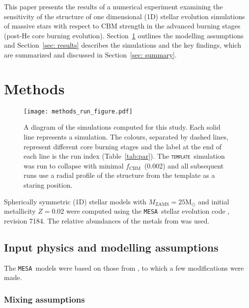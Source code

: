 \documentclass[useAMS,usenatbib]{mn2e}
\newcommand{\Msun}{\ensuremath{\mathrm{M}_\odot}}
\newcommand{\fcbm}{\ensuremath{f_\mathrm{CBM}}}
\newcommand{\mesa}{\texttt{MESA}}
\newcommand{\template}{\textsc{\texttt{template}}}
\begin{document}
This paper presents the results of a numerical experiment examining the sensitivity of the
structure of one dimensional (1D) stellar evolution simulations of massive stars
with respect to CBM strength in the advanced burning stages (post-He core
burning evolution). Section~\ref{sec: methods} outlines the modelling
assumptions and Section~\ref{sec: results} describes the simulations and the key
findings, which are summarized and discussed in Section~\ref{sec: summary}.

\section{Methods} \label{sec: methods}

\begin{figure*}
	\texttt{[image: methods\_run\_figure.pdf]}
	\caption{
		A diagram of the simulations computed for this study. Each solid line
		represents a simulation. The colours, separated by dashed lines, represent
		different core burning stages and the label at the end of each line is the run
		index (Table~\ref{tab:par}). The \template\ simulation was run to collapse
		with minimal \fcbm~(0.002) and all subsequent runs use a radial profile of the
		structure from the template as a staring position.
	}
	\label{fig:2_runs} %
\end{figure*}

Spherically symmetric (1D) stellar models with $M_\mathrm{ZAMS}=25\Msun$ and
initial metallicity $Z=0.02$ were computed using the \mesa~stellar
evolution code \citep{MESA2011,MESA2013,MESA2015}, revision 7184. The relative
abundances of the metals from \citet{Grevesse1993} was used.

\subsection{Input physics and modelling assumptions}

The \mesa~models were based on those from \citet{Jones2015}, to which a few
modifications were made.

\subsubsection{Mixing assumptions}
\end{document}
